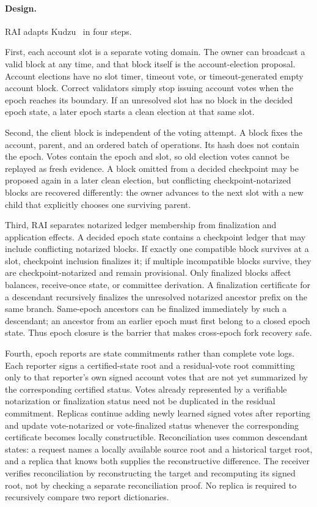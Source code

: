\documentclass[10pt,twocolumn]{article}
\begin{document}
\paragraph{Design.} RAI adapts Kudzu~\cite{Kudzu} in four steps.

First, each account slot is a separate voting domain. The owner can broadcast a valid block at any time, and that block itself is the account-election proposal. Account elections have no slot timer, timeout vote, or timeout-generated empty account block. Correct validators simply stop issuing account votes when the epoch reaches its boundary. If an unresolved slot has no block in the decided epoch state, a later epoch starts a clean election at that same slot.

Second, the client block is independent of the voting attempt. A block fixes the account, parent, and an ordered batch of operations. Its hash does not contain the epoch. Votes contain the epoch and slot, so old election votes cannot be replayed as fresh evidence. A block omitted from a decided checkpoint may be proposed again in a later clean election, but conflicting checkpoint-notarized blocks are recovered differently: the owner advances to the next slot with a new child that explicitly chooses one surviving parent.

Third, RAI separates notarized ledger membership from finalization and application effects. A decided epoch state contains a checkpoint ledger that may include conflicting notarized blocks. If exactly one compatible block survives at a slot, checkpoint inclusion finalizes it; if multiple incompatible blocks survive, they are checkpoint-notarized and remain provisional. Only finalized blocks affect balances, receive-once state, or committee derivation. A finalization certificate for a descendant recursively finalizes the unresolved notarized ancestor prefix on the same branch. Same-epoch ancestors can be finalized immediately by such a descendant; an ancestor from an earlier epoch must first belong to a closed epoch state. Thus epoch closure is the barrier that makes cross-epoch fork recovery safe.

Fourth, epoch reports are state commitments rather than complete vote logs. Each reporter signs a certified-state root and a residual-vote root committing only to that reporter's own signed account votes that are not yet summarized by the corresponding certified status. Votes already represented by a verifiable notarization or finalization status need not be duplicated in the residual commitment. Replicas continue adding newly learned signed votes after reporting and update vote-notarized or vote-finalized status whenever the corresponding certificate becomes locally constructible. Reconciliation uses common descendant states: a request names a locally available source root and a historical target root, and a replica that knows both supplies the reconstructive difference. The receiver verifies reconciliation by reconstructing the target and recomputing its signed root, not by checking a separate reconciliation proof. No replica is required to recursively compare two report dictionaries.
\end{document}
